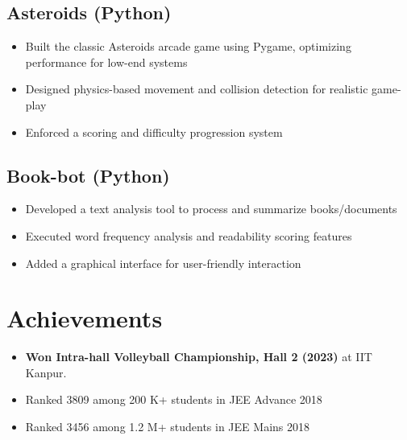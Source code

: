 \documentclass[9pt]{article}
\begin{document}
\subsection{Asteroids (Python)}
\begin{itemize}
    \item Built the classic Asteroids arcade game using Pygame, optimizing performance for low-end systems
    \item Designed physics-based movement and collision detection for realistic game-play
    \item Enforced a scoring and difficulty progression system
\end{itemize}

\subsection{Book-bot (Python)}
\begin{itemize}
    \item Developed a text analysis tool to process and summarize books/documents
    \item Executed word frequency analysis and readability scoring features
    \item Added a graphical interface for user-friendly interaction
\end{itemize}

\section{Achievements}
\begin{itemize}
    \item \textbf{Won Intra-hall Volleyball Championship, Hall 2 (2023)} at IIT Kanpur.
    \item Ranked 3809 among 200 K+ students in JEE Advance 2018
    \item Ranked 3456 among 1.2 M+ students in JEE Mains 2018
\end{itemize}
\end{document}
